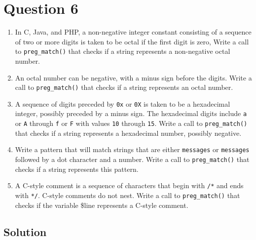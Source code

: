 
\section*{Question 6}

\begin{enumerate}[label=(\alph*)]
\item In C, Java, and PHP, a non-negative integer constant consisting of a sequence of two or more digits is taken to be octal if the first digit is zero, Write a call to \texttt{preg\_match()} that checks if a string represents a non-negative octal number.

\item An octal number can be negative, with a minus sign before the digits. Write a call to \texttt{preg\_match()} that checks if a string represents an octal number.

\item A sequence of digits preceded by \texttt{0x} or \texttt{0X} is taken to be a hexadecimal integer, possibly preceded by a minus sign. The hexadecimal digits include \texttt{a} or \texttt{A} through \texttt{f} or \texttt{F} with values \texttt{10} through \texttt{15}. Write a call to \texttt{preg\_match()} that checks if a string represents a hexadecimal number, possibly negative.

\item Write a pattern that will match strings that are  either \texttt{messages} or \texttt{messages} followed by a dot character and a number. Write a call to \texttt{preg\_match()} that checks if a string represents this pattern.

\item A C-style comment is a sequence of characters that begin with \texttt{/*} and ends with \texttt{*/}. C-style comments do not nest. Write a call to \texttt{preg\_match()} that checks if the variable \$line represents a C-style comment.

\end{enumerate}

\subsection*{Solution}

